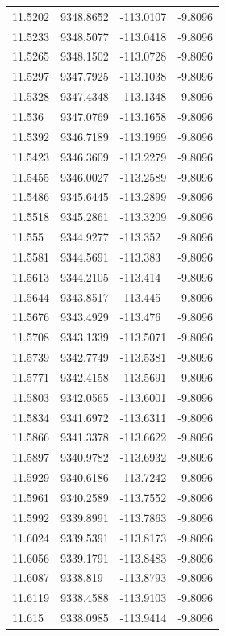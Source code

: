 \begin{table}[H]
\begin{tabular}{llll}
11.5202 & 9348.8652 & -113.0107 & -9.8096 \\
11.5233 & 9348.5077 & -113.0418 & -9.8096 \\
11.5265 & 9348.1502 & -113.0728 & -9.8096 \\
11.5297 & 9347.7925 & -113.1038 & -9.8096 \\
11.5328 & 9347.4348 & -113.1348 & -9.8096 \\
11.536 & 9347.0769 & -113.1658 & -9.8096 \\
11.5392 & 9346.7189 & -113.1969 & -9.8096 \\
11.5423 & 9346.3609 & -113.2279 & -9.8096 \\
11.5455 & 9346.0027 & -113.2589 & -9.8096 \\
11.5486 & 9345.6445 & -113.2899 & -9.8096 \\
11.5518 & 9345.2861 & -113.3209 & -9.8096 \\
11.555 & 9344.9277 & -113.352 & -9.8096 \\
11.5581 & 9344.5691 & -113.383 & -9.8096 \\
11.5613 & 9344.2105 & -113.414 & -9.8096 \\
11.5644 & 9343.8517 & -113.445 & -9.8096 \\
11.5676 & 9343.4929 & -113.476 & -9.8096 \\
11.5708 & 9343.1339 & -113.5071 & -9.8096 \\
11.5739 & 9342.7749 & -113.5381 & -9.8096 \\
11.5771 & 9342.4158 & -113.5691 & -9.8096 \\
11.5803 & 9342.0565 & -113.6001 & -9.8096 \\
11.5834 & 9341.6972 & -113.6311 & -9.8096 \\
11.5866 & 9341.3378 & -113.6622 & -9.8096 \\
11.5897 & 9340.9782 & -113.6932 & -9.8096 \\
11.5929 & 9340.6186 & -113.7242 & -9.8096 \\
11.5961 & 9340.2589 & -113.7552 & -9.8096 \\
11.5992 & 9339.8991 & -113.7863 & -9.8096 \\
11.6024 & 9339.5391 & -113.8173 & -9.8096 \\
11.6056 & 9339.1791 & -113.8483 & -9.8096 \\
11.6087 & 9338.819 & -113.8793 & -9.8096 \\
11.6119 & 9338.4588 & -113.9103 & -9.8096 \\
11.615 & 9338.0985 & -113.9414 & -9.8096 \\

\end{tabular}
\end{table}
